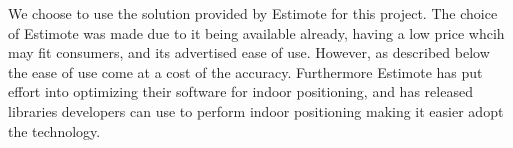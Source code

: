 We choose to use the solution provided by Estimote for this project.
The choice of Estimote was made due to it being available already, 
having a low price whcih may fit consumers, 
and its advertised ease of use. 
However, as described below the ease of use come at a cost of the accuracy.
Furthermore Estimote has put effort into optimizing their software for indoor positioning, 
and has released libraries developers can use to perform indoor positioning making it easier adopt the technology.


